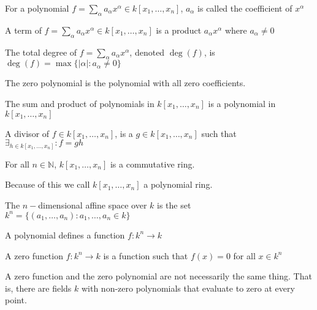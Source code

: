 \documentclass[crop=false,class=article,oneside]{standalone}
\begin{document}
    \begin{definition}
    For a polynomial $f = \sum_{\alpha} a_\alpha x^\alpha \in k[x_1,\hdots ,x_n]$, $a_\alpha$ is called the coefficient of $x^\alpha$
    \end{definition}
    \begin{definition}
    A term of $f=\sum_{\alpha} a_\alpha x^\alpha \in k[x_1,\hdots ,x_n]$ is a product $a_\alpha x^\alpha$ where $a_\alpha \ne 0$
    \end{definition}
    \begin{definition}
    The total degree of $f=\sum_{\alpha}a_\alpha x^\alpha$, denoted $\deg(f)$, is $\deg(f) = \max\{|\alpha|:a_\alpha \ne 0\}$
    \end{definition}
    \begin{definition}
    The zero polynomial is the polynomial with all zero coefficients.
    \end{definition}
    \begin{theorem}
    The sum and product of polynomials in $k[x_1,\hdots ,x_n]$ is a polynomial in $k[x_1,\hdots ,x_n]$
    \end{theorem}
    \begin{definition}
    A divisor of $f\in k[x_{1},\hdots ,x_{n}]$, is a $g\in k[x_{1},\hdots,x_{n}]$ such that $\exists_{h\in k[x_{1},\hdots,x_{n}]}:f = gh$
    \end{definition}
    \begin{theorem}
    For all $n\in\mathbb{N}$, $k[x_1,\hdots ,x_n]$ is a commutative ring.
    \end{theorem}
    \begin{remark}
    Because of this we call $k[x_1,\hdots ,x_n]$ a polynomial ring.
    \end{remark}
    \begin{definition}
    The $n-$dimensional affine space over $k$ is the set $k^{n}=\{(a_1,\hdots, a_n):a_1,\hdots,a_n \in k\}$
    \end{definition}
    \begin{remark}
    A polynomial defines a function $f:k^n \rightarrow k$
    \end{remark}
    \begin{definition}
    A zero function $f:k^n \rightarrow k$ is a function such that $f(x) = 0$ for all $x\in k^n$
    \end{definition}
    \begin{remark}
    A zero function and the zero polynomial are not necessarily the same thing. That is, there are fields $k$ with non-zero polynomials that evaluate to zero at every point.
    \end{remark}
\end{document}
